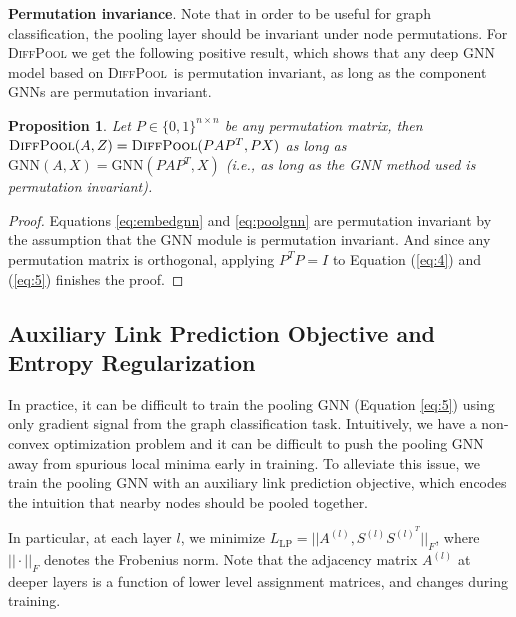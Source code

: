 \documentclass{article}
\newcommand{\xhdr}[1]{{\noindent\bfseries #1}.}
\newcommand{\name}{\textsc{DiffPool}\xspace}
\newcommand{\gnn}{\textrm{GNN}}
\newcommand{\cut}[1]{}
\newtheorem{proposition}{Proposition}
\begin{document}
\xhdr{Permutation invariance}
Note that in order to be useful for graph classification, the pooling layer should be invariant under node permutations. For \name we get the following positive result, which shows that any deep GNN model based on \name\ is permutation invariant, as long as the component GNNs are permutation invariant. 
\begin{proposition}
\label{prop:permute}
Let $P\in \{0,1\}^{n\times n}$ be any permutation matrix, then $\text{\sc \name}(A, Z) = \text{\sc \name}(PAP^T,PX)$ as long as $\gnn(A, X) = \gnn(PAP^T, X)$ (i.e., as long as the GNN method used is permutation invariant).
\end{proposition}
\begin{proof}
Equations \eqref{eq:embedgnn} and \eqref{eq:poolgnn} are permutation invariant by the assumption that the GNN module is permutation invariant. 
And since any permutation matrix is orthogonal, applying $P^T P=I$ to Equation (\ref{eq:4}) and (\ref{eq:5}) finishes the proof.
\end{proof}


\subsection{Auxiliary Link Prediction Objective and Entropy Regularization}

In practice, it can be difficult to train the pooling GNN (Equation \ref{eq:5}) using only gradient signal from the graph classification task.
Intuitively, we have a non-convex optimization problem and it can be difficult to push the pooling GNN away from spurious local minima early in training.
To alleviate this issue, we train the pooling GNN with an auxiliary link prediction objective, which encodes the intuition that nearby nodes should be pooled together. 
\cut{
Controlling input features and representation dimension is still insufficient for $g_\phi$ to learn and extract meaningful cluster information from a graph. We additionally supply side objectives as regularizations for $g_\phi$. 
Intuitively, $g_\phi$ should learn to assign nodes that are close together in terms of connectivity into the same clusters. 
Hence, we use a link prediction objective to further encourage similarity of cluster assignments.}
In particular, at each layer $l$, we minimize
$L_{\text{LP}} = ||A^{(l)}, S^{(l)} S^{{(l)}^T}||_F$, where $||\cdot||_F$ denotes the Frobenius norm. 
Note that the adjacency matrix $A^{(l)}$ at deeper layers is a function of lower level assignment matrices, and changes during training. 
\end{document}
